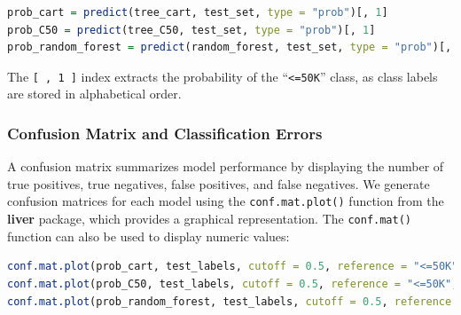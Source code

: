 \documentclass[
]{book}
\newcommand{\passthrough}[1]{#1}
\theoremstyle{definition}
\theoremstyle{definition}
\theoremstyle{definition}
\theoremstyle{definition}
\theoremstyle{remark}
\begin{document}
\begin{lstlisting}[language=R]
prob_cart = predict(tree_cart, test_set, type = "prob")[, 1]
prob_C50 = predict(tree_C50, test_set, type = "prob")[, 1]
prob_random_forest = predict(random_forest, test_set, type = "prob")[, 1]
\end{lstlisting}

The \passthrough{\lstinline![ , 1 ]!} index extracts the probability of the ``\passthrough{\lstinline!<=50K!}'' class, as class labels are stored in alphabetical order.

\subsubsection*{Confusion Matrix and Classification Errors}\label{confusion-matrix-and-classification-errors}

A confusion matrix summarizes model performance by displaying the number of true positives, true negatives, false positives, and false negatives. We generate confusion matrices for each model using the \passthrough{\lstinline!conf.mat.plot()!} function from the \textbf{liver} package, which provides a graphical representation. The \passthrough{\lstinline!conf.mat()!} function can also be used to display numeric values:

\begin{lstlisting}[language=R]
conf.mat.plot(prob_cart, test_labels, cutoff = 0.5, reference = "<=50K", main = "CART Prediction")
conf.mat.plot(prob_C50, test_labels, cutoff = 0.5, reference = "<=50K", main = "C5.0 Prediction")
conf.mat.plot(prob_random_forest, test_labels, cutoff = 0.5, reference = "<=50K", main = "Random Forest Prediction")
\end{lstlisting}
\end{document}

